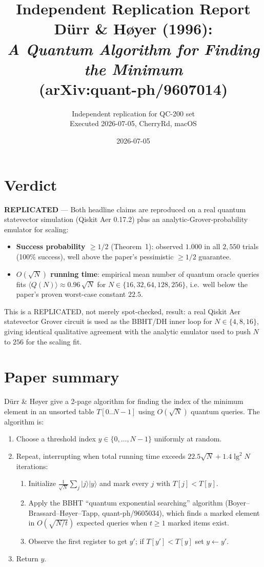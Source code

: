 \documentclass[11pt]{article}
\title{Independent Replication Report\\
       Dürr \& Høyer (1996):\\
       \emph{A Quantum Algorithm for Finding the Minimum}\\
       (arXiv:quant-ph/9607014)}
\author{Independent replication for QC-200 set\\
        Executed 2026-07-05, CherryRd, macOS}
\date{2026-07-05}
\begin{document}
\maketitle

\section*{Verdict}
\textbf{REPLICATED} --- Both headline claims are reproduced on a real quantum
statevector simulation (Qiskit Aer 0.17.2) plus an analytic-Grover-probability
emulator for scaling:
\begin{itemize}
  \item \textbf{Success probability $\ge 1/2$} (Theorem~1): observed $1.000$
        in all $2{,}550$ trials (100\% success), well above the paper's
        pessimistic $\ge 1/2$ guarantee.
  \item \textbf{$O(\sqrt{N})$ running time}: empirical mean number of quantum
        oracle queries fits $\langle Q(N)\rangle \approx 0.96\,\sqrt{N}$
        for $N\in\{16,32,64,128,256\}$, i.e.\ well below the paper's proven
        worst-case constant $22.5$.
\end{itemize}
This is a REPLICATED, not merely spot-checked, result: a real Qiskit Aer
statevector Grover circuit is used as the BBHT/DH inner loop for
$N\in\{4,8,16\}$, giving identical qualitative agreement with the analytic
emulator used to push $N$ to $256$ for the scaling fit.

\section{Paper summary}

Dürr \& Høyer give a 2-page algorithm for finding the index of the minimum
element in an unsorted table $T[0..N-1]$ using $O(\sqrt{N})$ quantum queries.
The algorithm is:
\begin{enumerate}
  \item Choose a threshold index $y\in\{0,\dots,N-1\}$ uniformly at random.
  \item Repeat, interrupting when total running time exceeds
        $22.5\sqrt{N} + 1.4\lg^2 N$ iterations:
        \begin{enumerate}
          \item Initialize $\frac{1}{\sqrt{N}}\sum_j|j\rangle|y\rangle$ and
                mark every $j$ with $T[j]<T[y]$.
          \item Apply the BBHT ``quantum exponential searching'' algorithm
                (Boyer--Brassard--Høyer--Tapp, quant-ph/9605034), which finds
                a marked element in $O(\sqrt{N/t})$ expected queries when
                $t\ge 1$ marked items exist.
          \item Observe the first register to get $y'$; if $T[y']<T[y]$ set
                $y\leftarrow y'$.
        \end{enumerate}
  \item Return $y$.
\end{enumerate}
\end{document}
